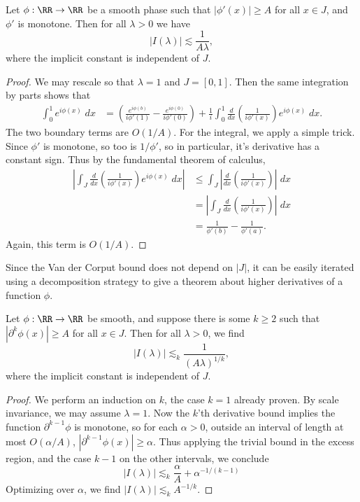 \begin{lemma}
  Let $\phi: \RR \to \RR$ be a smooth phase such that $|\phi'(x)| \geq A$ for all $x \in J$, and $\phi'$ is monotone. Then for all $\lambda > 0$ we have
  \[ |I(\lambda)| \lesssim \frac{1}{A \lambda}, \]
  where the implicit constant is independent of $J$.
\end{lemma}
\begin{proof}
  We may rescale so that $\lambda = 1$ and $J = [0,1]$. Then the same integration by parts shows that
  \begin{align*}
    \int_0^1 e^{i \phi(x)}\; dx &= \left( \frac{e^{i \phi(b)}}{i \phi'(1)} - \frac{e^{i \phi(0)}}{i \phi'(0)} \right) + \frac{1}{i} \int_0^1 \frac{d}{dx} \left( \frac{1}{i \phi'(x)} \right) e^{i \phi(x)}\; dx.
  \end{align*}
  The two boundary terms are $O(1/A)$. For the integral, we apply a simple trick. Since $\phi'$ is monotone, so too is $1/\phi'$, so in particular, it's derivative has a constant sign. Thus by the fundamental theorem of calculus,
  \begin{align*}
    \left| \int_J \frac{d}{dx} \left( \frac{1}{i \phi'(x)} \right) e^{i \phi(x)}\; dx \right| &\leq \int_J \left| \frac{d}{dx} \left( \frac{1}{i \phi'(x)} \right)  \right|\; dx\\
    &= \left| \int_J \frac{d}{dx} \left( \frac{1}{i \phi'(x)} \right) \right|\; dx\\
    &= \frac{1}{\phi'(b)} - \frac{1}{\phi'(a)}.
  \end{align*}
  Again, this term is $O(1/A)$.
\end{proof}

Since the Van der Corput bound does not depend on $|J|$, it can be easily iterated using a decomposition strategy to give a theorem about higher derivatives of a function $\phi$.

\begin{lemma}
  Let $\phi: \RR \to \RR$ be smooth, and suppose there is some $k \geq 2$ such that $|\partial^k \phi(x)| \geq A$ for all $x \in J$. Then for all $\lambda > 0$, we find
  \[ |I(\lambda)| \lesssim_k \frac{1}{(A \lambda)^{1/k}}, \]
  where the implicit constant is independent of $J$.
\end{lemma}
\begin{proof}
  We perform an induction on $k$, the case $k = 1$ already proven. By scale invariance, we may assume $\lambda = 1$. Now the $k$'th derivative bound implies the function $\partial^{k-1} \phi$ is monotone, so for each $\alpha > 0$, outside an interval of length at most $O(\alpha/A)$, $|\partial^{k-1} \phi(x)| \geq \alpha$. Thus applying the trivial bound in the excess region, and the case $k - 1$ on the other intervals, we conclude
  \[ |I(\lambda)| \lesssim_k \frac{\alpha}{A} + \alpha^{-1/(k-1)} \]
  Optimizing over $\alpha$, we find $|I(\lambda)| \lesssim_k A^{-1/k}$.
\end{proof}

